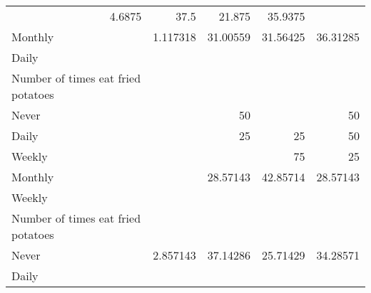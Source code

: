 \documentclass{article}
\begin{document}
\begin{tabular}{lllll}
  \multicolumn{1}{|r}{4.6875} &
  \multicolumn{1}{r}{37.5} &
  \multicolumn{1}{r}{21.875} &
  \multicolumn{1}{r}{35.9375} \\
\multicolumn{1}{l}{\hspace{5em}Monthly} &
  \multicolumn{1}{|r}{1.117318} &
  \multicolumn{1}{r}{31.00559} &
  \multicolumn{1}{r}{31.56425} &
  \multicolumn{1}{r}{36.31285} \\
\multicolumn{1}{l}{\hspace{3em}Daily} &
  \multicolumn{1}{|r}{} &
  \multicolumn{1}{r}{} &
  \multicolumn{1}{r}{} &
  \multicolumn{1}{r}{} \\
\multicolumn{1}{l}{\hspace{4em}Number of times eat fried potatoes} &
  \multicolumn{1}{|r}{} &
  \multicolumn{1}{r}{} &
  \multicolumn{1}{r}{} &
  \multicolumn{1}{r}{} \\
\multicolumn{1}{l}{\hspace{5em}Never} &
  \multicolumn{1}{|r}{} &
  \multicolumn{1}{r}{50} &
  \multicolumn{1}{r}{} &
  \multicolumn{1}{r}{50} \\
\multicolumn{1}{l}{\hspace{5em}Daily} &
  \multicolumn{1}{|r}{} &
  \multicolumn{1}{r}{25} &
  \multicolumn{1}{r}{25} &
  \multicolumn{1}{r}{50} \\
\multicolumn{1}{l}{\hspace{5em}Weekly} &
  \multicolumn{1}{|r}{} &
  \multicolumn{1}{r}{} &
  \multicolumn{1}{r}{75} &
  \multicolumn{1}{r}{25} \\
\multicolumn{1}{l}{\hspace{5em}Monthly} &
  \multicolumn{1}{|r}{} &
  \multicolumn{1}{r}{28.57143} &
  \multicolumn{1}{r}{42.85714} &
  \multicolumn{1}{r}{28.57143} \\
\multicolumn{1}{l}{\hspace{3em}Weekly} &
  \multicolumn{1}{|r}{} &
  \multicolumn{1}{r}{} &
  \multicolumn{1}{r}{} &
  \multicolumn{1}{r}{} \\
\multicolumn{1}{l}{\hspace{4em}Number of times eat fried potatoes} &
  \multicolumn{1}{|r}{} &
  \multicolumn{1}{r}{} &
  \multicolumn{1}{r}{} &
  \multicolumn{1}{r}{} \\
\multicolumn{1}{l}{\hspace{5em}Never} &
  \multicolumn{1}{|r}{2.857143} &
  \multicolumn{1}{r}{37.14286} &
  \multicolumn{1}{r}{25.71429} &
  \multicolumn{1}{r}{34.28571} \\
\multicolumn{1}{l}{\hspace{5em}Daily} &

\end{tabular}
\end{document}
